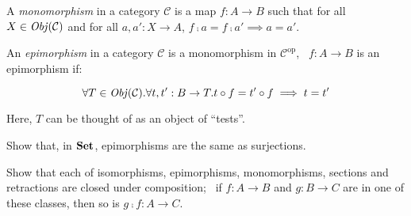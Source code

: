 \begin{definition}[Monomorphism]
A \emph{monomorphism} in a category $\mathcal{C}$ is a map $f : A \to B$ such
that for all $X \in \operatorname{\mathit{Obj}}(\mathcal{C})$ and for all $a, a' : X \to A$,
$f \comp a = f \comp a' \implies a = a'$.
\end{definition}

\begin{definition}[Epimorphism]
An \emph{epimorphism} in a category $\mathcal{C}$ is a monomorphism in
$\mathcal{C}^{\mathrm{op}}$, \ie~$f : A \to B$ is an epimorphism if:

\begin{equation*}
    \forall T \in \operatorname{\mathit{Obj}}(\mathcal{C}) . \forall t, t' : B \to T .
    t \circ f = t' \circ f \implies t = t'
\end{equation*}

Here, $T$ can be thought of as an object of ``tests''.
\end{definition}

\begin{exercise}
Show that, in $\mathbf {Set}$, epimorphisms are the same as surjections.
\end{exercise}

\begin{exercise}
Show that each of isomorphisms, epimorphisms, monomorphisms, sections and
retractions are closed under composition; \ie~if $f : A \to B$ and 
$g : B \to C$ are in one of these classes, then so is $g \comp f : A \to C$.
\end{exercise}

